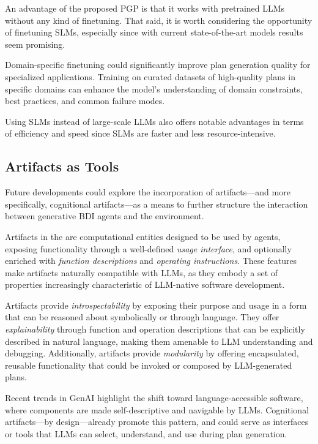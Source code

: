 \documentclass[12pt,a4paper,openright,twoside]{book}
\begin{document}
An advantage of the proposed PGP is that it works with pretrained LLMs without any kind of finetuning.
%
That said, it is worth considering the opportunity of finetuning \acp{SLM}, especially since with current state-of-the-art models results seem promising.

Domain-specific finetuning could significantly improve plan generation quality for specialized applications. 
%
Training on curated datasets of high-quality plans in specific domains can enhance the model's understanding of domain constraints, best practices, and common failure modes.

Using \acp{SLM} instead of large-scale \acp{LLM} also offers notable advantages in terms of efficiency and speed since \acp{SLM} are faster and less resource-intensive.

\subsection{Artifacts as Tools}\label{sec:artifacts}

Future developments could explore the incorporation of artifacts---and more specifically, cognitional artifacts---as a means to further structure the interaction between generative \ac{BDI} agents and the environment.

Artifacts in the \aaa{} are computational entities designed to be used by agents, exposing functionality through a well-defined \textit{usage interface}, and optionally enriched with \textit{function descriptions} and \textit{operating instructions}.
%
These features make artifacts naturally compatible with \acp{LLM}, as they embody a set of properties increasingly characteristic of \ac{LLM}-native software development.

Artifacts provide \textit{introspectability} by exposing their purpose and usage in a form that can be reasoned about symbolically or through language.
%
They offer \textit{explainability} through function and operation descriptions that can be explicitly described in natural language, making them amenable to \ac{LLM} understanding and debugging. 
%
Additionally, artifacts provide \textit{modularity} by offering encapsulated, reusable functionality that could be invoked or composed by \ac{LLM}-generated plans.

Recent trends in GenAI highlight the shift toward language-accessible software, where components are made self-descriptive and navigable by \acp{LLM}. 
%
Cognitional artifacts---by design---already promote this pattern, and could serve as interfaces or tools that \acp{LLM} can select, understand, and use during plan generation.
\end{document}
